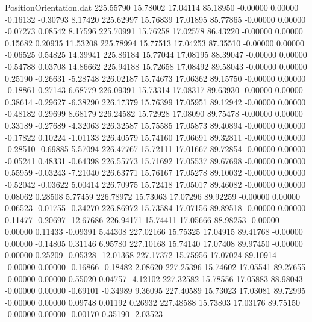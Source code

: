 \begin{filecontents}{PositionOrientation.dat}
 225.55790   15.78002   17.04114    85.18950   -0.00000    0.00000   -0.16132   -0.30793    8.17420
 225.62997   15.76839   17.01895    85.77865   -0.00000    0.00000   -0.07273    0.08542    8.17596
 225.70991   15.76258   17.02578    86.43220   -0.00000    0.00000    0.15682    0.20935   11.53208
 225.78994   15.77513   17.04253    87.35510   -0.00000    0.00000   -0.06525    0.54825   14.39941
 225.86184   15.77044   17.08195    88.39047   -0.00000    0.00000   -0.54788    0.03708   14.86662
 225.94188   15.72658   17.08492    89.58043   -0.00000    0.00000    0.25190   -0.26631   -5.28748
 226.02187   15.74673   17.06362    89.15750   -0.00000    0.00000   -0.18861    0.27143    6.68779
 226.09391   15.73314   17.08317    89.63930   -0.00000    0.00000    0.38614   -0.29627   -6.38290
 226.17379   15.76399   17.05951    89.12942   -0.00000    0.00000   -0.48182    0.29699    8.68179
 226.24582   15.72928   17.08090    89.75478   -0.00000    0.00000    0.33189   -0.27689   -4.32063
 226.32587   15.75585   17.05873    89.40894   -0.00000    0.00000   -0.17822    0.10224   -1.01133
 226.40579   15.74160   17.06691    89.32811   -0.00000    0.00000   -0.28510   -0.69885    5.57094
 226.47767   15.72111   17.01667    89.72854   -0.00000    0.00000   -0.05241    0.48331   -0.64398
 226.55773   15.71692   17.05537    89.67698   -0.00000    0.00000    0.55959   -0.03243   -7.21040
 226.63771   15.76167   17.05278    89.10032   -0.00000    0.00000   -0.52042   -0.03622    5.00414
 226.70975   15.72418   17.05017    89.46082   -0.00000    0.00000    0.08062    0.28508    5.77459
 226.78972   15.73063   17.07296    89.92259   -0.00000    0.00000    0.06523   -0.01755   -0.34270
 226.86972   15.73584   17.07156    89.89518   -0.00000    0.00000    0.11477   -0.20697  -12.67686
 226.94171   15.74411   17.05666    88.98253   -0.00000    0.00000    0.11433   -0.09391    5.44308
 227.02166   15.75325   17.04915    89.41768   -0.00000    0.00000   -0.14805    0.31146    6.95780
 227.10168   15.74140   17.07408    89.97450   -0.00000    0.00000    0.25209   -0.05328  -12.01368
 227.17372   15.75956   17.07024    89.10914   -0.00000    0.00000   -0.16866   -0.18482    2.08620
 227.25396   15.74602   17.05541    89.27655   -0.00000    0.00000    0.55020    0.04757   -4.12102
 227.32582   15.78556   17.05883    88.98043   -0.00000    0.00000   -0.69101   -0.34989    9.36095
 227.40589   15.73023   17.03081    89.72995   -0.00000    0.00000    0.09748    0.01192    0.26932
 227.48588   15.73803   17.03176    89.75150   -0.00000    0.00000   -0.00170    0.35190   -2.03523

\end{filecontents}
